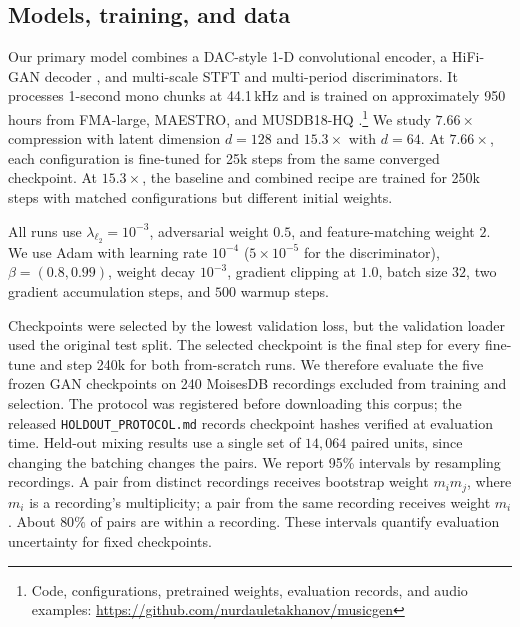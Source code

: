 \documentclass[conference]{IEEEtran}
\begin{document}
\subsection{Models, training, and data}\label{sec:setup}
Our primary model combines a DAC-style 1-D convolutional encoder, a
HiFi-GAN decoder \cite{kong2020hifigan}, and multi-scale STFT and multi-period
discriminators. It processes 1-second mono chunks at 44.1\,kHz and is trained
on approximately 950 hours from FMA-large, MAESTRO, and MUSDB18-HQ
\cite{rafii2017musdb18}.\footnote{Code, configurations, pretrained weights,
evaluation records, and audio examples:
\url{https://github.com/nurdauletakhanov/musicgen}}
We study $7.66\times$ compression with latent dimension $d=128$ and
$15.3\times$ with $d=64$. At $7.66\times$, each configuration is fine-tuned
for 25k steps from the same converged checkpoint. At $15.3\times$, the
baseline and combined recipe are trained for 250k steps with matched
configurations but different initial weights.

All runs use $\lambda_{\ell_2}=10^{-3}$, adversarial weight $0.5$, and
feature-matching weight $2$. We use Adam with learning rate $10^{-4}$
($5{\times}10^{-5}$ for the discriminator), $\beta=(0.8,0.99)$, weight decay
$10^{-3}$, gradient clipping at $1.0$, batch size $32$, two gradient
accumulation steps, and $500$ warmup steps.

Checkpoints were selected by the lowest validation loss, but the validation
loader used the original test split. The selected checkpoint is the final
step for every fine-tune and step 240k for both from-scratch runs. We
therefore evaluate the five frozen GAN checkpoints on 240 MoisesDB
recordings \cite{pereira2023moisesdb} excluded from training and selection.
The protocol was registered before downloading this corpus; the released
\texttt{HOLDOUT\_PROTOCOL.md} records checkpoint hashes verified at evaluation
time. Held-out mixing results use a single set of $14{,}064$ paired units,
since changing the batching changes the pairs. We report 95\% intervals by
resampling recordings. A pair from distinct recordings receives bootstrap
weight $m_i m_j$, where $m_i$ is a recording's multiplicity; a pair from the
same recording receives weight $m_i$. About $80\%$ of pairs are within a
recording. These intervals quantify evaluation uncertainty for fixed
checkpoints.
\end{document}
